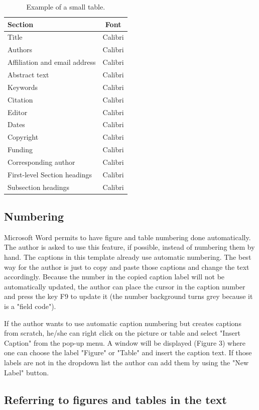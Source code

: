 \documentclass[10pt]{imeko_acta}
\begin{document}
\begin{table}[!b]
	\caption{Example of a small table.}
	\label{tab:tab2}
	\centering
\begin{tabular}{lc}
	\toprule
	Section & Font \\
	\midrule
	Title & Calibri \\
	Authors & Calibri \\
	Affiliation and email address & Calibri \\
	Abstract text & Calibri \\
	Keywords & Calibri \\
	Citation & Calibri \\
	Editor & Calibri \\
	Dates & Calibri \\
	Copyright & Calibri \\
	Funding & Calibri \\
	Corresponding author & Calibri \\
	First-level Section headings  & Calibri \\
	Subsection headings & Calibri \\
	\bottomrule
\end{tabular}
\end{table}

\subsection{Numbering}

Microsoft Word permits to have figure and table numbering done automatically. The author is asked to use this feature, if possible, instead of numbering them by hand. The captions in this template already use automatic numbering. The best way for the author is just to copy and paste those captions and change the text accordingly. Because the number in the copied caption label will not be automatically updated, the author can place the cursor in the caption number and press the key F9 to update it (the number background turns grey because it is a "field code").

If the author wants to use automatic caption numbering but creates captions from scratch, he/she can right click on the picture or table and select "Insert Caption" from the pop-up menu. A window will be displayed (Figure 3) where one can choose the label "Figure" or "Table" and insert the caption text. If those labels are not in the dropdown list the author can add them by using the "New Label" button.


\subsection{Referring to figures and tables in the text}\label{sec:reffig}
\end{document}
